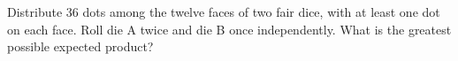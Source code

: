 Distribute $36$ dots among the twelve faces of two fair dice, with at least one dot on each face. Roll die A twice and die B once independently. What is the greatest possible expected product?
